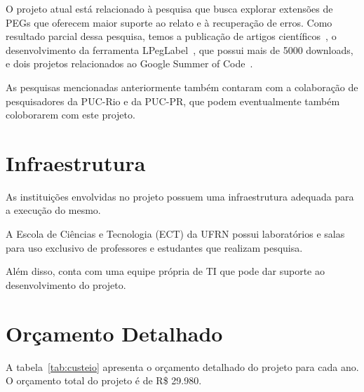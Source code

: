 \documentclass[titlepage,12pt]{article}
\begin{document}
O projeto atual está relacionado à pesquisa que busca
explorar extensões de PEGs que oferecem maior suporte ao relato
e à recuperação de erros. Como resultado
parcial dessa pesquisa, temos a publicação de artigos
científicos~\cite{maidl2016peglabel,medeiros2016sac,medeiros2018sblp},
o desenvolvimento da ferramenta LPegLabel~\cite{lpeglabel},
que possui mais de 5000 downloads, e dois projetos
relacionados ao Google Summer of Code~\cite{summer2016,summer2017}.

As pesquisas mencionadas anteriormente também contaram com a colaboração
de pesquisadores da PUC-Rio e da PUC-PR, que podem eventualmente também
coloborarem com este projeto.
 


\section{Infraestrutura}
\label{sec:infra}

As instituições envolvidas no projeto possuem uma
infraestrutura adequada para a execução do mesmo.

A Escola de Ciências e Tecnologia (ECT) da UFRN possui
laboratórios e salas para uso exclusivo de professores
e estudantes que realizam pesquisa.

Além disso, conta com uma equipe própria de TI que pode
dar suporte ao desenvolvimento do projeto.



\section{Orçamento Detalhado}
\label{sec:orcamento}

A tabela~\ref{tab:custeio} apresenta o orçamento detalhado do projeto para
cada ano. O orçamento total do projeto é de R\$ 29.980.
\end{document}
